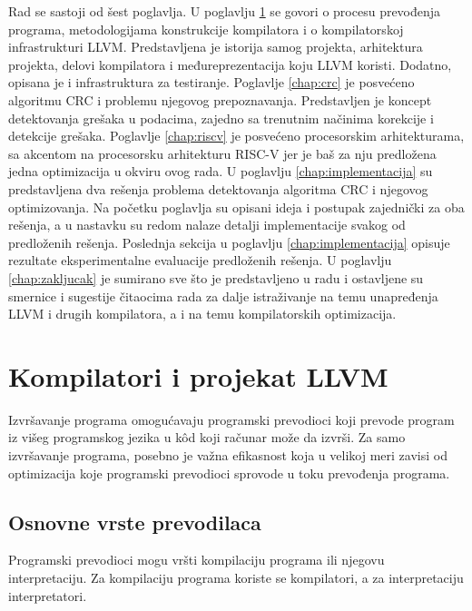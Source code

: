 \documentclass[12pt,oneside]{memoir}
\begin{document}
Rad se sastoji od šest poglavlja. U poglavlju \ref{chap:llvm} se govori o procesu prevođenja programa, metodologijama konstrukcije kompilatora i o kompilatorskoj infrastrukturi LLVM. Predstavljena je istorija samog projekta, arhitektura projekta, delovi kompilatora i međureprezentacija koju LLVM koristi. Dodatno, opisana je i infrastruktura za testiranje. 
Poglavlje \ref{chap:crc} je posvećeno algoritmu CRC i problemu njegovog prepoznavanja. Predstavljen je koncept detektovanja grešaka u podacima, zajedno sa trenutnim načinima korekcije i detekcije grešaka. Poglavlje \ref{chap:riscv} je posvećeno procesorskim arhitekturama, sa akcentom na procesorsku arhitekturu RISC-V jer je baš za nju predložena jedna optimizacija u okviru ovog rada. 
U poglavlju \ref{chap:implementacija} su predstavljena dva rešenja problema detektovanja algoritma CRC i njegovog optimizovanja. Na početku poglavlja su opisani ideja i postupak zajednički za oba rešenja, a u nastavku su redom nalaze detalji implementacije svakog od predloženih rešenja.
Poslednja sekcija u poglavlju \ref{chap:implementacija} opisuje rezultate eksperimentalne evaluacije predloženih rešenja. 
U poglavlju \ref{chap:zakljucak} je sumirano sve što je predstavljeno u radu i ostavljene su smernice i sugestije čitaocima rada za dalje istraživanje na temu unapređenja LLVM i drugih kompilatora, a i na temu kompilatorskih optimizacija. 

\chapter{Kompilatori i projekat LLVM}
\label{chap:llvm}
 
Izvršavanje programa omogućavaju programski prevodioci koji prevode program iz višeg programskog jezika u k\^od koji računar može da izvrši. Za samo izvršavanje programa, posebno je važna efikasnost koja u velikoj meri zavisi od optimizacija koje programski prevodioci sprovode u toku prevođenja programa.  

\section{Osnovne vrste prevodilaca}
Programski prevodioci mogu vršti kompilaciju programa ili njegovu interpretaciju. Za kompilaciju programa koriste se kompilatori, a za interpretaciju interpretatori.
\end{document}
